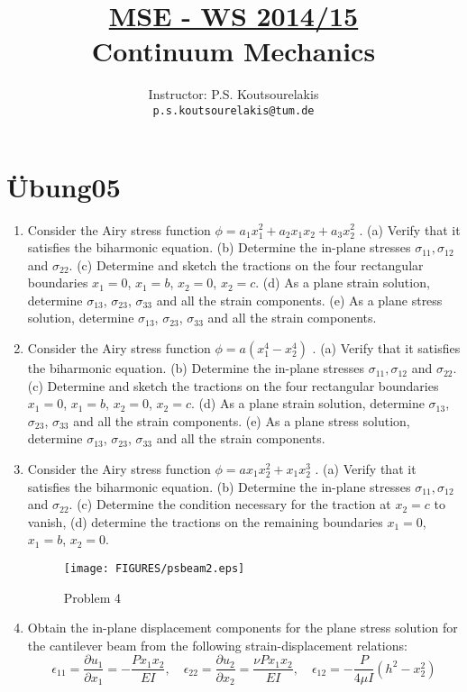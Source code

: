 \documentclass{article}
\title{\underline{MSE - WS 2014/15}\\
Continuum Mechanics}
\author{
Instructor: P.S. Koutsourelakis  \\
\texttt{p.s.koutsourelakis@tum.de} \\
}
\newcommand{\ee}{\end{equation}}
\newcommand{\be}{\begin{equation}}
\newcommand{\pa}{\partial}
\begin{document}
\makeanontitle

%

\section*{\"Ubung05}



\begin{enumerate}


\item   Consider the Airy stress function $\phi=  a_1 x_1^2+   a_2 x_1 x_2 +  a_3 x_2^2$ . (a) Verify that it satisfies the biharmonic equation. (b) Determine the in-plane stresses $\sigma_{11}, \sigma_{12}$ and $\sigma_{22}$. (c) Determine and sketch the tractions
on the four rectangular boundaries $x_1 = 0$,  $x_1 = b$,  $x_2=0$, $x_2= c$. (d) As a plane strain solution, determine $\sigma_{13}$, $\sigma_{23}$, $\sigma_{33}$ and all the strain components. (e) As a plane stress solution, determine $\sigma_{13}$, $\sigma_{23}$, $\sigma_{33}$
and all the strain components.

\item   Consider the Airy stress function $\phi=  a (x_1^4-x_2^4)$ . (a) Verify that it satisfies the biharmonic equation. (b) Determine the in-plane stresses $\sigma_{11}, \sigma_{12}$ and $\sigma_{22}$. (c) Determine and sketch the tractions
on the four rectangular boundaries $x_1 = 0$,  $x_1 = b$,  $x_2=0$, $x_2= c$. (d) As a plane strain solution, determine $\sigma_{13}$, $\sigma_{23}$, $\sigma_{33}$ and all the strain components. (e) As a plane stress solution, determine $\sigma_{13}$, $\sigma_{23}$, $\sigma_{33}$
and all the strain components.

\item   Consider the Airy stress function $\phi=  a  x_1 x_2^2+  x_1 x_2^3$ . (a) Verify that it satisfies the biharmonic equation. (b) Determine the in-plane stresses $\sigma_{11}, \sigma_{12}$ and $\sigma_{22}$. (c)   Determine the condition necessary for the traction at $x_2 = c$ to vanish, (d) determine  the tractions on the remaining boundaries $x_1 = 0$,  $x_1 = b$,  $x_2=0$. 

\begin{figure}[!h]
\centering
{}
\texttt{[image: FIGURES/psbeam2.eps]}
\label{fig:cantips}
\caption{Problem 4}
\end{figure}
 \item Obtain the in-plane displacement components for the plane stress solution for the cantilever beam from the following strain-displacement relations:
\be
\epsilon_{11}=\frac{ \pa u_1}{\pa x_1}=-\frac{P x_1x_2}{E I}, \quad \epsilon_{22}=\frac{ \pa u_2}{\pa x_2}=\frac{\nu P x_1x_2}{E I}, \quad \epsilon_{12}=-\frac{P }{4 \mu  I} (h^2-x_2^2)
\ee


\end{enumerate}
\end{document}
